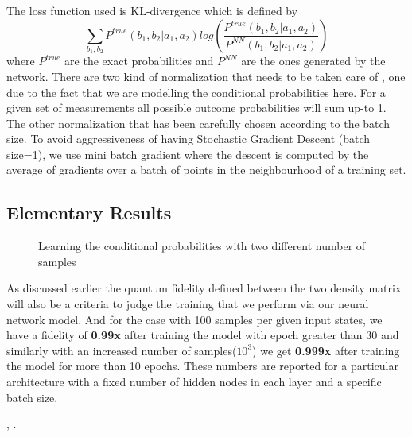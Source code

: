 \documentclass[a4paper]{article}
\begin{document}
The loss function used is KL-divergence which is defined by \begin{equation}
    \sum_{b_{1},b_{2}}P^{true}(b_{1}, b_{2} |a_{1}, a_{2})log(\frac{P^{true}(b_{1}, b_{2} |a_{1}, a_{2})}{P^{NN}(b_{1}, b_{2} |a_{1}, a_{2})})
\end{equation} where $P^{true}$ are the exact probabilities and $P^{NN}$ are the ones generated by the network. There are two kind of normalization that needs to be taken care of , one due to the fact that we are modelling the conditional probabilities here. For a given set of measurements all possible outcome probabilities will sum up-to 1. The other normalization that has been carefully chosen according to the batch size. To avoid aggressiveness of having Stochastic Gradient Descent (batch size=1), we use mini batch gradient where the descent is computed by the average of gradients over a batch of points in the neighbourhood of a training set. 
\pagebreak
\subsection*{Elementary Results}
\begin{figure}[H]
    \centering
    \qquad
    \caption{Learning the conditional probabilities with two different number of samples}%
    \label{fig:example}%
\end{figure}
As discussed earlier the quantum fidelity defined between the  two  density  matrix  will  also  be  a  criteria  to  judge  the  training  that  we  perform  via  our neural network model. And for the case with 100 samples per given input states, we have a fidelity of \textbf{0.99x} after training the model with epoch greater than 30 and similarly with an increased number of samples($10^3$) we get \textbf{0.999x} after training the model for more than 10 epochs. These numbers are reported for a particular architecture with a fixed number of hidden nodes in each layer and a specific batch size.

\begin{thebibliography}{9}
,  \textit{}.
\end{thebibliography}
\end{document}
